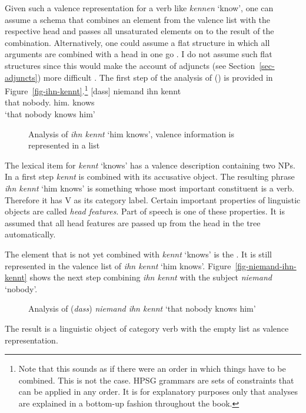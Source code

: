 Given such a valence representation for a verb like \emph{kennen} `know', one can assume a schema
that combines an element from the valence list with the respective head and passes all unsaturated
elements on to the result of the combination. Alternatively, one could assume a flat structure in
which all arguments are combined with a head in one go \parencites[34]{GSag2000a-u}[Section~3]{MuellerOrder}. I do not assume such flat structures since
this would make the account of adjuncts (see Section~\ref{sec-adjuncts}) more difficult \citep[377--378]{MuellerOrder}.
The first step of the analysis of () is
provided in Figure~\vref{fig-ihn-kennt}.\footnote{%
  Note that this sounds as if there were an order in which things have to be combined. This is not
  the case. HPSG grammars are sets of constraints that can be applied in any order. It is for
  explanatory purposes only that analyses are explained in a bottom-up fashion throughout the book.%
}
\ea
\label{ex-dass-niemand-ihn-kennt}
\gll  {}[dass] niemand ihn kennt\\
      \spacebr{}that nobody.\NOM{} him.\ACC{} knows\\ 
\glt `that nobody knows him'
\z
\begin{figure}
\centerfit{%
\begin{forest}
sm edges
[{V \sliste{ NP[\type{nom}] } }
  [{NP[\type{acc}]} [ihn;him] ]
  [{V \sliste{ NP[\type{nom}], NP[\type{acc}] }} [kennt;knows]] ] ]
\end{forest}}
\caption{\label{fig-ihn-kennt}Analysis of \emph{ihn kennt} `him knows', valence information is represented in a list}
\end{figure}
The lexical item for \emph{kennt} `knows' has a valence description containing two NPs. In a first
step \emph{kennt} is combined with its accusative object. The resulting phrase \emph{ihn kennt} `him
knows' is something whose most important constituent is a verb. Therefore it has V as its category
label. Certain important properties of linguistic objects are called \emph{head features}. Part of speech
is one of these properties. It is assumed that all head features are passed up from the head in the tree
automatically.

The element that is not yet combined with \emph{kennt} `knows' is the \npnom. It is still
represented in the valence list of \emph{ihn kennt} `him knows'. Figure~\vref{fig-niemand-ihn-kennt}
shows the next step combining \emph{ihn kennt} with the subject \emph{niemand} `nobody'.
\begin{figure}
\caption{\label{fig-niemand-ihn-kennt}Analysis of (\emph{dass}) \emph{niemand ihn kennt} `that nobody
  knows him'}
\end{figure}
The result is a linguistic object of category verb with the empty list as valence representation.


